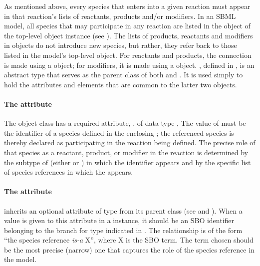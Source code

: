 As mentioned above, every species that enters into a given
reaction must appear in that reaction's lists of reactants,
products and/or modifiers.  In an SBML model, all species that may
participate in any reaction are listed in the \ListOfSpecies
object of the top-level \Model object instance (see
).  The lists of products, reactants and
modifiers in \Reaction objects do not introduce new species, but
rather, they refer back to those listed in the model's top-level
\ListOfSpecies object.  For reactants and products, the connection
is made using a \SpeciesReference object; for modifiers, it is
made using a \ModifierSpeciesReference object.
\SimpleSpeciesReference, defined in , is
an abstract type that serves as the parent class of both
\SpeciesReference and \ModifierSpeciesReference.  It is used
simply to hold the attributes and elements that are common to the
latter two objects.


\paragraph{The  attribute}

The \SimpleSpeciesReference object class has a required attribute,
, of data type ,
  The value of  must be
the identifier of a species defined in the enclosing \Model; the
referenced species is thereby declared as participating in the
reaction being defined.  The precise role of that species as a
reactant, product, or modifier in the reaction is determined by
the subtype of \SimpleSpeciesReference (\ie either
\SpeciesReference or \ModifierSpeciesReference) in which the
identifier appears and by the specific list of species references
in which the \SpeciesReference appears.


\paragraph{The  attribute}
\label{sec:simplespeciesreference-sboterm}

\SimpleSpeciesReference inherits an optional 
attribute of type  from its parent class \SBase
(see  and ).  When
a value is given to this attribute in a \SimpleSpeciesReference
instance, it should be an SBO identifier belonging to the branch
for type \SimpleSpeciesReference indicated in
.  The relationship is of the
form ``the species reference \emph{is-a} X'', where X is the SBO
term.  The term chosen should be the most precise (narrow) one
that captures the role of the species reference in the model.

